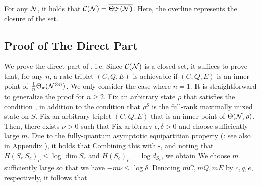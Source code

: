 \documentclass[journal]{IEEEtran}
\begin{document}
For any ${\mathcal N}$, it holds that ${\mathcal C}({\mathcal N})=\overline{\Theta_{\pi}^{\infty}({\mathcal N})}$.
Here, the overline represents the closure of the set.
\ethm




\subsection{Proof of The Direct Part}

We prove the direct part of , i.e.
Since ${\mathcal C}({\mathcal N})$ is a closed set, 
it suffices to prove that, for any $n$, a rate triplet $(C,Q,E)$ is achievable if $(C,Q,E)$ is an inner point of $\frac{1}{n}\Theta_{\pi}({\mathcal N}^{\otimes n})$.
We only consider the case where $n=1$.
It is straightforward to generalize the proof for $n\geq 2$. 
Fix an arbitrary state $\rho$ that satisfies the condition , in addition to the condition that $\rho^S$ is the full-rank maximally mixed state on $S$. Fix an arbitrary triplet $(C,Q,E)$ that is an inner point of $\Theta({\mathcal N},\rho)$.
Then, there exists $\nu>0$ such that
Fix arbitrary $\epsilon,\delta>0$ and choose sufficiently large $m$.
Due to the fully-quantum asymptotic equipartition property (\cite{tomamichel2009fully}: see also  in Appendix ), it holds that
Combining this with -, and noting that $H(S_r|S_c)_\rho\leq\log{\dim{S_r}}$ and $H(S_c)_\rho=\log{ d_{S_c}}$, we obtain
We choose $m$ sufficiently large so that we have $-m\nu\leq\log{\delta}$. 
Denoting $mC,mQ,mE$ by $c,q,e$, respectively, it follows that
\end{document}

